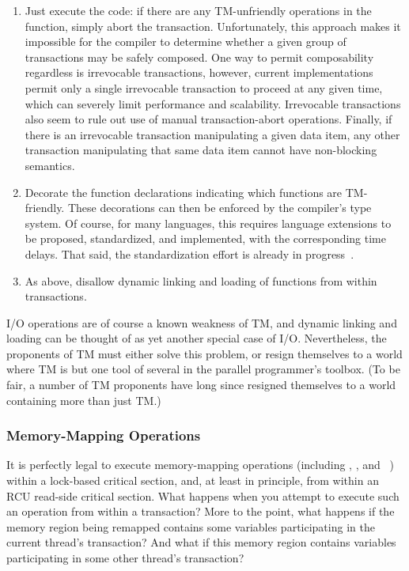 \begin{enumerate}
\item	Just execute the code: if there are any TM-unfriendly operations
	in the function, simply abort the transaction.
	Unfortunately, this approach makes it impossible for the compiler
	to determine whether a given group of transactions may be safely
	composed.
	One way to permit composability regardless is irrevocable
	transactions, however, current implementations permit only a
	single irrevocable transaction to proceed at any given time,
	which can severely limit performance and scalability.
	Irrevocable transactions also seem to rule out use of manual
	transaction-abort operations.
	Finally, if there is an irrevocable transaction manipulating
	a given data item, any other transaction manipulating that
	same data item cannot have non-blocking semantics.
\item	Decorate the function declarations indicating which functions
	are TM-friendly.
	These decorations can then be enforced by the compiler's type system.
	Of course, for many languages, this requires language extensions
	to be proposed, standardized, and implemented, with the
	corresponding time delays.
	That said, the standardization effort is already in
	progress~\cite{Ali-Reza-Adl-Tabatabai2009CppTM}.
\item	As above, disallow dynamic linking and loading of functions from
	within transactions.
\end{enumerate}

I/O operations are of course a known weakness of TM, and dynamic linking
and loading can be thought of as yet another special case of I/O.
Nevertheless, the proponents of TM must either solve this problem, or
resign themselves to a world where TM is but one tool of several in the
parallel programmer's toolbox.
(To be fair, a number of TM proponents have long since resigned themselves
to a world containing more than just TM.)

\subsubsection{Memory-Mapping Operations}
\label{sec:future:Memory-Mapping Operations}

It is perfectly legal to execute memory-mapping operations (including
, , and ~\cite{TheOpenGroup1997SUS})
within a lock-based critical section,
and, at least in principle, from within an RCU read-side critical section.
What happens when you attempt to execute such an operation from within
a transaction?
More to the point, what happens if the memory region being remapped
contains some variables participating in the current thread's transaction?
And what if this memory region contains variables participating in some
other thread's transaction?

